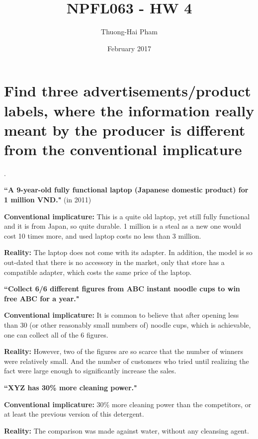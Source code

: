 \documentclass{article}
\title{NPFL063 - HW 4}
\author{Thuong-Hai Pham}
\date{February 2017}
\begin{document}
\maketitle

\section*{Find three advertisements/product labels, where the information really meant by the producer is different from the conventional implicature}

.

\textbf{``A 9-year-old fully functional laptop (Japanese domestic product) for 1 million VND."} (in 2011)

\textbf{Conventional implicature:} This is a quite old laptop, yet still fully functional and it is from Japan, so quite durable. 1 million is a steal as a new one would cost 10 times more, and used laptop costs no less than 3 million.

\textbf{Reality:} The laptop does not come with its adapter. In addition, the model is so out-dated that there is no accessory in the market, only that store has a compatible adapter, which costs the same price of the laptop.

\bigskip

\textbf{``Collect 6/6 different figures from ABC instant noodle cups to win free ABC for a year."}

\textbf{Conventional implicature:} It is common to believe that after opening less than 30 (or other reasonably small numbers of) noodle cups, which is achievable, one can collect all of the 6 figures.

\textbf{Reality:} However, two of the figures are so scarce that the number of winners were relatively small. And the number of customers who tried until realizing the fact were large enough to significantly increase the sales.

\bigskip

\textbf{``XYZ has 30\% more cleaning power."}

\textbf{Conventional implicature:} 30\% more cleaning power than the competitors, or at least the previous version of this detergent.

\textbf{Reality:} The comparison was made against water, without any cleansing agent.
\end{document}
